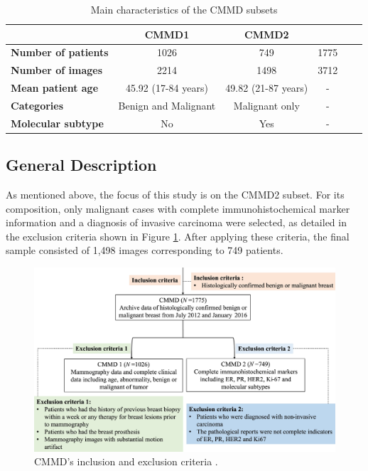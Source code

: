 \documentclass[a4paper,10pt]{book}
\begin{document}
\begin{table}
        \caption[CMMD subsets characteristics]{Main characteristics of the CMMD subsets}
	\centering
	\begin{tabular}{lccccc}
		\toprule
		                            & \textbf{CMMD1}       & \textbf{CMMD2}      &      \\
		\midrule
		\textbf{Number of patients} & 1026                 & 749                 & 1775 \\
		\textbf{Number of images}   & 2214                 & 1498                & 3712 \\
		\textbf{Mean patient age}   & 45.92 (17-84 years)  & 49.82 (21-87 years) & -    \\
		\textbf{Categories}         & Benign and Malignant & Malignant only      & -    \\
		\textbf{Molecular subtype}  & No                   & Yes                 & -    \\
		\bottomrule
	\end{tabular}
	\label{tab:cmmd_features}
\end{table}


\subsection{General Description}

As mentioned above, the focus of this study is on the CMMD2 subset. For its composition, only malignant cases with complete immunohistochemical marker information and a diagnosis of invasive carcinoma were selected, as detailed in the exclusion criteria shown in Figure \ref{fig:cmmd_criteria}. After applying these criteria, the final sample consisted of 1,498 images corresponding to 749 patients.

\begin{figure}[h]
	\centering
	\includegraphics[width=0.8\linewidth]{reports//assets/cmmd_criteria.png}
	\caption[CMMD's inclusion and exclusion criteria]{CMMD's inclusion and exclusion criteria \cite{cai_online_2023}.}
	\label{fig:cmmd_criteria}
\end{figure}
\end{document}
